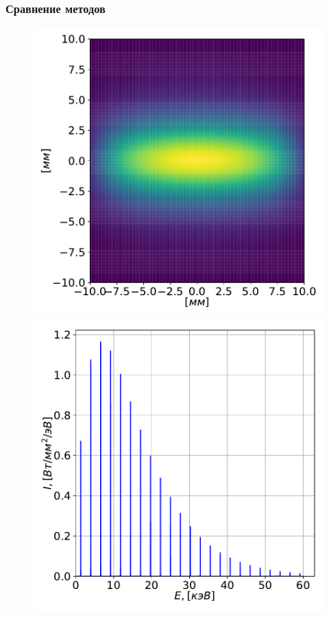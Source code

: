 \documentclass[14pt, hyperref = {colorlinks},xcolor=table ]{beamer}
\begin{document}
\small
\begin{frame}
\frametitle{Сравнение методов}\label{t1}
\vspace{-10pt}
\begin{figure}[h]
	\begin{minipage}[h]{0.49\linewidth}
		\includegraphics[width=0.99\linewidth]{pic/power_dens_1-1_2d.pdf}
	\end{minipage}	
	\begin{minipage}[h]{0.49\linewidth}
		\includegraphics[width=0.99\linewidth]{pic/Spec_1-1.pdf}

\end{minipage}
\end{figure}
\end{frame}
\end{document}
